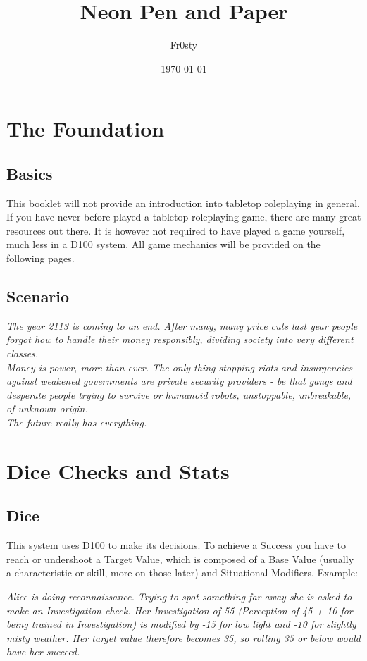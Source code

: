 \documentclass[12pt,a4paper,openany]{book}
\title{Neon Pen and Paper}
\author{Fr0sty}
\date{\today}
\begin{document}
	\maketitle
	\tableofcontents
	
	\chapter{The Foundation}
	\section{Basics}
	This booklet will not provide an introduction into tabletop roleplaying in general. If you have never before played a tabletop roleplaying game, there are many great resources out there. It is however not required to have played a game yourself, much less in a D100 system. All game mechanics will be provided on the following pages.
	\section{Scenario}
	\begin{exampleblock}\textit{
		The year 2113 is coming to an end. After many, many price cuts last year people forgot how to handle their money responsibly, dividing society into \emph{very} different classes. \\
		Money is power, more than ever. The only thing stopping riots and insurgencies against weakened governments are private security providers - be that gangs and desperate people trying to survive or humanoid robots, unstoppable, unbreakable, of unknown origin. \\
		The future really has everything.
	}\end{exampleblock}
	
	\chapter{Dice Checks and Stats}
	\section{Dice}
	This system uses D100 to make its decisions. To achieve a Success you have to reach or undershoot a Target Value, which is composed of a Base Value (usually a characteristic or skill, more on those later) and Situational Modifiers. Example:
	
	\begin{exampleblock}
		\textit{Alice is doing reconnaissance. Trying to spot something far away she is asked to make an Investigation check. Her Investigation of 55 (Perception of 45 + 10 for being trained in Investigation) is modified by -15 for low light and -10 for slightly misty weather. Her target value therefore becomes 35, so rolling 35 or below would have her succeed.}
	\end{exampleblock}
\end{document}
